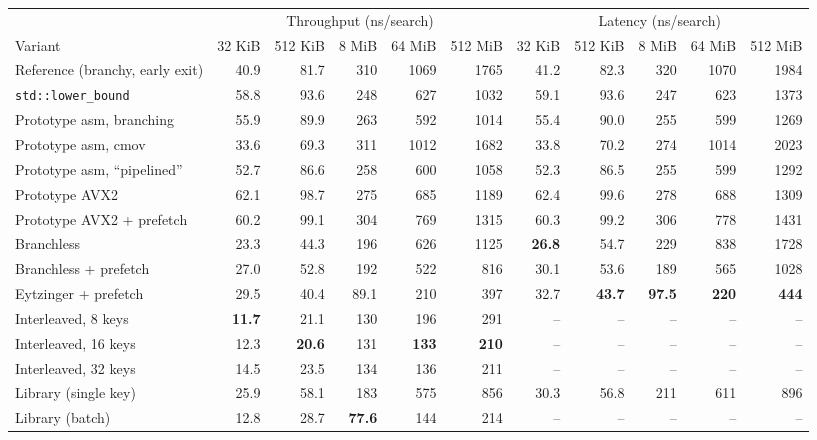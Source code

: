 \begin{tabular}{lrrrrr@{\hskip 1.2em}rrrrr}
\toprule
 & \multicolumn{5}{c}{Throughput (ns/search)} & \multicolumn{5}{c}{Latency (ns/search)}\\
\cmidrule(lr){2-6}\cmidrule(lr){7-11}
Variant & \multicolumn{1}{c}{32 KiB} & \multicolumn{1}{c}{512 KiB} & \multicolumn{1}{c}{8 MiB} & \multicolumn{1}{c}{64 MiB} & \multicolumn{1}{c}{512 MiB} & \multicolumn{1}{c}{32 KiB} & \multicolumn{1}{c}{512 KiB} & \multicolumn{1}{c}{8 MiB} & \multicolumn{1}{c}{64 MiB} & \multicolumn{1}{c}{512 MiB}\\
\midrule
Reference (branchy, early exit) & 40.9 & 81.7 & 310 & 1069 & 1765 & 41.2 & 82.3 & 320 & 1070 & 1984\\
\texttt{std::lower\_bound} & 58.8 & 93.6 & 248 & 627 & 1032 & 59.1 & 93.6 & 247 & 623 & 1373\\
Prototype asm, branching & 55.9 & 89.9 & 263 & 592 & 1014 & 55.4 & 90.0 & 255 & 599 & 1269\\
Prototype asm, cmov & 33.6 & 69.3 & 311 & 1012 & 1682 & 33.8 & 70.2 & 274 & 1014 & 2023\\
Prototype asm, ``pipelined'' & 52.7 & 86.6 & 258 & 600 & 1058 & 52.3 & 86.5 & 255 & 599 & 1292\\
Prototype AVX2 & 62.1 & 98.7 & 275 & 685 & 1189 & 62.4 & 99.6 & 278 & 688 & 1309\\
Prototype AVX2 + prefetch & 60.2 & 99.1 & 304 & 769 & 1315 & 60.3 & 99.2 & 306 & 778 & 1431\\
Branchless & 23.3 & 44.3 & 196 & 626 & 1125 & \textbf{26.8} & 54.7 & 229 & 838 & 1728\\
Branchless + prefetch & 27.0 & 52.8 & 192 & 522 & 816 & 30.1 & 53.6 & 189 & 565 & 1028\\
Eytzinger + prefetch & 29.5 & 40.4 & 89.1 & 210 & 397 & 32.7 & \textbf{43.7} & \textbf{97.5} & \textbf{220} & \textbf{444}\\
Interleaved, 8 keys & \textbf{11.7} & 21.1 & 130 & 196 & 291 & -- & -- & -- & -- & --\\
Interleaved, 16 keys & 12.3 & \textbf{20.6} & 131 & \textbf{133} & \textbf{210} & -- & -- & -- & -- & --\\
Interleaved, 32 keys & 14.5 & 23.5 & 134 & 136 & 211 & -- & -- & -- & -- & --\\
Library (single key) & 25.9 & 58.1 & 183 & 575 & 856 & 30.3 & 56.8 & 211 & 611 & 896\\
Library (batch) & 12.8 & 28.7 & \textbf{77.6} & 144 & 214 & -- & -- & -- & -- & --\\
\bottomrule
\end{tabular}
